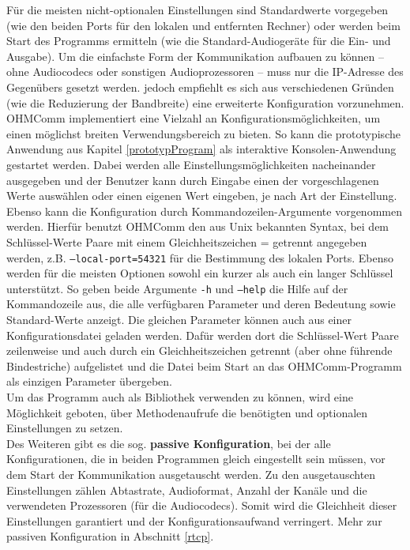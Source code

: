Für die meisten nicht-optionalen Einstellungen sind Standardwerte vorgegeben (wie den beiden Ports für den lokalen und entfernten Rechner) oder werden beim Start des Programms ermitteln (wie die Standard-Audiogeräte für die Ein- und Ausgabe). Um die einfachste Form der Kommunikation aufbauen zu können -- ohne Audiocodecs oder sonstigen Audioprozessoren -- muss nur die IP-Adresse des Gegenübers gesetzt werden. jedoch empfiehlt es sich aus verschiedenen Gründen (wie die Reduzierung der Bandbreite) eine erweiterte Konfiguration vorzunehmen.
\\%
OHMComm implementiert eine Vielzahl an Konfigurationsmöglichkeiten, um einen möglichst breiten Verwendungsbereich zu bieten. So kann die prototypische Anwendung aus Kapitel \ref{prototypProgram} als interaktive Konsolen-Anwendung gestartet werden. Dabei werden alle Einstellungsmöglichkeiten nacheinander ausgegeben und der Benutzer kann durch Eingabe einen der vorgeschlagenen Werte auswählen oder einen eigenen Wert eingeben, je nach Art der Einstellung.
\\
Ebenso kann die Konfiguration durch Kommandozeilen-Argumente vorgenommen werden. Hierfür benutzt OHMComm den aus Unix bekannten Syntax, bei dem Schlüssel-Werte Paare mit einem Gleichheitszeichen = getrennt angegeben werden, z.B. \texttt{--local-port=54321} für die Bestimmung des lokalen Ports. Ebenso werden für die meisten Optionen sowohl ein kurzer als auch ein langer Schlüssel unterstützt. So geben beide Argumente \texttt{-h} und \texttt{--help} die Hilfe auf der Kommandozeile aus, die alle verfügbaren Parameter und deren Bedeutung sowie Standard-Werte anzeigt. Die gleichen Parameter können auch aus einer Konfigurationsdatei geladen werden. Dafür werden dort die Schlüssel-Wert Paare zeilenweise und auch durch ein Gleichheitszeichen getrennt (aber ohne führende Bindestriche) aufgelistet und die Datei beim Start an das OHMComm-Programm als einzigen Parameter übergeben.
\\
Um das Programm auch als Bibliothek verwenden zu können, wird eine Möglichkeit geboten, über Methodenaufrufe die benötigten und optionalen Einstellungen zu setzen. %
\\
Des Weiteren gibt es die sog. \textbf{passive Konfiguration}, bei der alle Konfigurationen, die in beiden Programmen gleich eingestellt sein müssen, vor dem Start der Kommunikation ausgetauscht werden. Zu den ausgetauschten Einstellungen zählen Abtastrate, Audioformat, Anzahl der Kanäle und die verwendeten Prozessoren (für die Audiocodecs). Somit wird die Gleichheit dieser Einstellungen garantiert und der Konfigurationsaufwand verringert. Mehr zur passiven Konfiguration in Abschnitt \ref{rtcp}.

